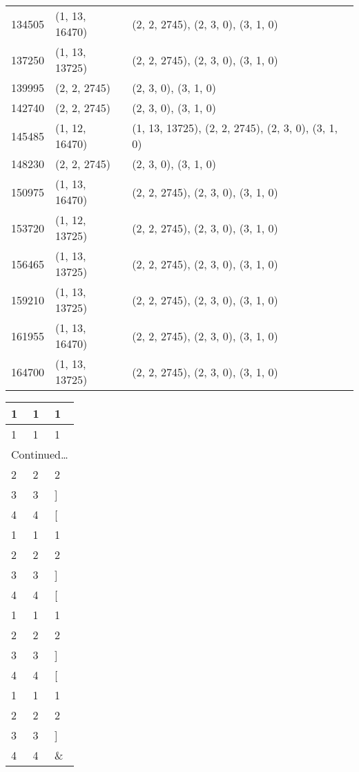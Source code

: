 \documentclass[10pt,a4paper]{article}
\begin{document}
\begin{center}
\begin{longtable}{lll}
			134505 & (1, 13, 16470) & (2, 2, 2745), (2, 3, 0), (3, 1, 0) \\
			137250 & (1, 13, 13725) & (2, 2, 2745), (2, 3, 0), (3, 1, 0) \\
			139995 & (2, 2, 2745) & (2, 3, 0), (3, 1, 0) \\
			142740 & (2, 2, 2745) & (2, 3, 0), (3, 1, 0) \\
			145485 & (1, 12, 16470) & (1, 13, 13725), (2, 2, 2745), (2, 3, 0), (3, 1, 0) \\
			148230 & (2, 2, 2745) & (2, 3, 0), (3, 1, 0) \\
			150975 & (1, 13, 16470) & (2, 2, 2745), (2, 3, 0), (3, 1, 0) \\
			153720 & (1, 12, 13725) & (2, 2, 2745), (2, 3, 0), (3, 1, 0) \\
			156465 & (1, 13, 13725) & (2, 2, 2745), (2, 3, 0), (3, 1, 0) \\
			159210 & (1, 13, 13725) & (2, 2, 2745), (2, 3, 0), (3, 1, 0) \\
			161955 & (1, 13, 16470) & (2, 2, 2745), (2, 3, 0), (3, 1, 0) \\
			164700 & (1, 13, 13725) & (2, 2, 2745), (2, 3, 0), (3, 1, 0) \\
		\end{longtable}
	\end{center}
	
	\begin{center}
	\begin{longtable}{lll} 
		
		1 & 1 & 1 \\ 
		\endfirsthead 
		1 & 1 & 1 \\ 
		\endhead 
		\multicolumn{3}{c}{Continued\ldots} \\ 
		
		\endfoot 
		\hline 
		\endlastfoot 
		
		2 & 2 & 2 \\ 
		3 & 3 & ] \\ 
		4 & 4 & [ \\ 
		1 & 1 & 1 \\ 
		2 & 2 & 2 \\ 
		3 & 3 & ] \\ 
		4 & 4 & [ \\ 
		1 & 1 & 1 \\ 
		2 & 2 & 2 \\ 
		3 & 3 & ] \\ 
		4 & 4 & [ \\ 
		1 & 1 & 1 \\ 
		2 & 2 & 2 \\ 
		3 & 3 & ] \\ 
		4 & 4 & \& \\ 
		
	\end{longtable}
\end{center}
\end{document}
